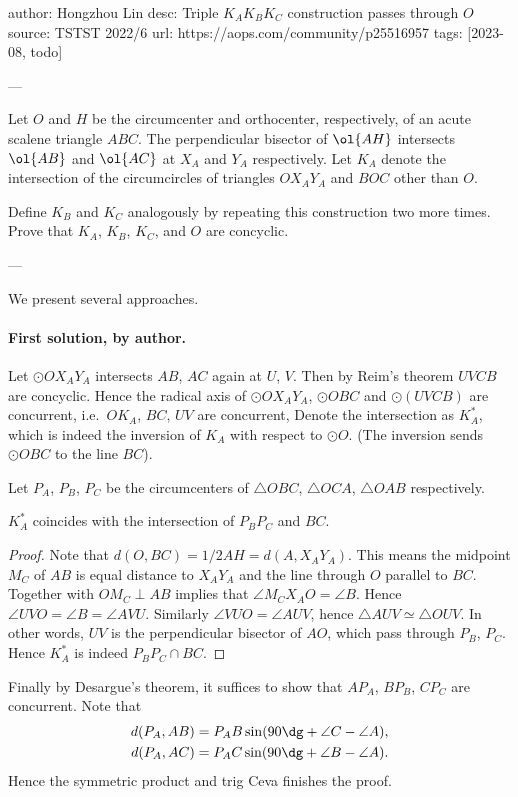 author: Hongzhou Lin
desc: Triple $K_A K_B K_C$ construction passes through $O$
source: TSTST 2022/6
url: https://aops.com/community/p25516957
tags: [2023-08, todo]

---

Let $O$ and $H$ be the circumcenter and orthocenter,
respectively, of an acute scalene triangle $ABC$.
The perpendicular bisector of $\ol{AH}$ intersects
$\ol{AB}$ and $\ol{AC}$ at $X_A$ and $Y_A$ respectively.
Let $K_A$ denote the intersection of
the circumcircles of triangles $OX_AY_A$ and $BOC$ other than $O$.

Define $K_B$ and $K_C$ analogously by repeating this construction two more times.
Prove that $K_A$, $K_B$, $K_C$, and $O$ are concyclic.

---

We present several approaches.

\paragraph{First solution, by author.}
Let $\odot OX_AY_A$ intersects $AB$, $AC$ again at $U$, $V$.
Then by Reim's theorem $UVCB$ are concyclic.
Hence the radical axis of $\odot OX_AY_A$, $\odot OBC$ and $\odot (UVCB)$
are concurrent, i.e.\ $OK_A$, $BC$,  $UV$ are concurrent,
Denote the intersection as $K_A^\ast$,
which is indeed the inversion of $K_A$ with respect to $\odot O$.
(The inversion sends $\odot OBC$ to the line $BC$).

Let $P_A$, $P_B$, $P_C$ be the circumcenters of $\triangle OBC$,
$\triangle OCA$, $\triangle OAB$ respectively.

\begin{claim*}
  $K_A^\ast$ coincides with the intersection of $P_BP_C$ and $BC$.
\end{claim*}
\begin{proof}
  Note that $d(O, BC) = 1/2 AH = d(A,X_AY_A)$.
  This means the midpoint $M_C$ of $AB$ is equal distance
  to $X_AY_A$ and the line through $O$ parallel to $BC$.
  Together with $OM_C \perp AB$ implies that $\angle M_CX_AO = \angle B$.
  Hence $\angle UVO = \angle B = \angle AVU$.
  Similarly $\angle VUO = \angle AUV$,
  hence $\triangle AUV \simeq \triangle OUV$.
  In other words, $UV$ is the perpendicular bisector of $AO$,
  which pass through $P_B$, $P_C$.
  Hence $K_A^\ast$ is indeed $P_BP_C \cap BC$.
\end{proof}

Finally by Desargue's theorem,
it suffices to show that $AP_A$, $BP_B$, $CP_C$ are concurrent.
Note that
\begin{align*}
  d(P_A, AB) &= P_AB \sin (90\dg + \angle C - \angle A), \\
  d(P_A, AC) &= P_AC \sin (90\dg + \angle B - \angle A).
\end{align*}
Hence the symmetric product and trig Ceva finishes the proof.

